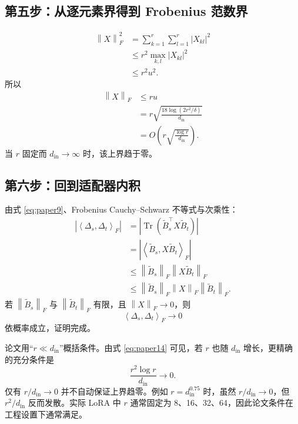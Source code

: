 \documentclass[UTF8,12pt,a4paper,fontset=none]{ctexart}
\numberwithin{equation}{section}
\newcommand{\norm}[1]{\left\lVert #1\right\rVert}
\newcommand{\ip}[2]{\left\langle #1,#2\right\rangle_F}
\newcommand{\tr}{\operatorname{Tr}}
\begin{document}
\subsection{第五步：从逐元素界得到 Frobenius 范数界}

\begin{align}
  \norm{X}_F^2
  &=\sum_{k=1}^{r}\sum_{l=1}^{r}|X_{kl}|^2\\
  &\le r^2\max_{k,l}|X_{kl}|^2\\
  &\le r^2u^2.
  \tag{13}
\end{align}
所以
\begin{align}
  \norm{X}_F
  &\le ru\\
  &=r\sqrt{
  \frac{18\log(2r^2/\delta)}{d_{\mathrm{in}}}
  }\\
  &=O\left(
  r\sqrt{\frac{\log r}{d_{\mathrm{in}}}}
  \right).
  \tag{14}
  \label{eq:paper14}
\end{align}
当 $r$ 固定而 $d_{\mathrm{in}}\to\infty$ 时，该上界趋于零。

\subsection{第六步：回到适配器内积}

由式 \eqref{eq:paper9}、Frobenius Cauchy--Schwarz 不等式与次乘性：
\begin{align}
  \left|\ip{\Delta_s}{\Delta_t}\right|
  &=\left|\tr(\widetilde B_s^{\top}X\widetilde B_t)\right|\\
  &=\left|\ip{\widetilde B_s}{X\widetilde B_t}\right|\\
  &\le \norm{\widetilde B_s}_F
  \norm{X\widetilde B_t}_F\\
  &\le \norm{\widetilde B_s}_F
  \norm{X}_F
  \norm{\widetilde B_t}_F.
  \tag{15}
  \label{eq:paper15}
\end{align}
若 $\norm{\widetilde B_s}_F$ 与 $\norm{\widetilde B_t}_F$ 有限，且 $\norm{X}_F\to0$，则
\begin{equation}
  \ip{\Delta_s}{\Delta_t}\to0
\end{equation}
依概率成立，证明完成。

\begin{criticalbox}[比论文表述更精确的增长条件]
论文用“$r\ll d_{\mathrm{in}}$”概括条件。由式 \eqref{eq:paper14} 可见，若 $r$ 也随 $d_{\mathrm{in}}$ 增长，更精确的充分条件是
\begin{equation*}
  \frac{r^2\log r}{d_{\mathrm{in}}}\to0.
\end{equation*}
仅有 $r/d_{\mathrm{in}}\to0$ 并不自动保证上界趋零。例如 $r=d_{\mathrm{in}}^{0.75}$ 时，虽然 $r/d_{\mathrm{in}}\to0$，但 $r^2/d_{\mathrm{in}}$ 反而发散。实际 LoRA 中 $r$ 通常固定为 8、16、32、64，因此论文条件在工程设置下通常满足。
\end{criticalbox}
\end{document}

